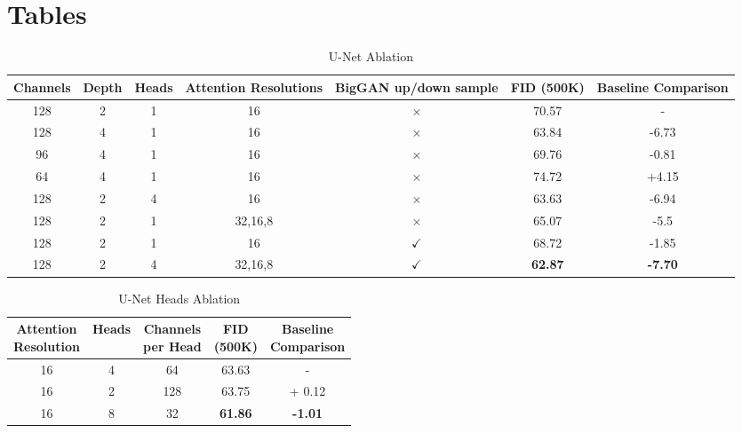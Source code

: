 \documentclass[conference]{IEEEtran}
\begin{document}
\section{Tables}



\begin{table}[H]
    \centering
    \caption{U-Net Ablation}
    \label{tab:unet_table}
    \begin{tabular}{ccccccc}
    \hline
        Channels & Depth & Heads & Attention Resolutions & BigGAN up/down sample & FID (500K) & Baseline Comparison \\ \hline
        \hline
        128 & 2 & 1 & 16 & $\times$ & 70.57 & - \\
        \hline
        128 & 4 & 1 & 16 & $\times$ & 63.84 & -6.73 \\ 
        96 & 4 & 1 & 16 & $\times$ & 69.76 & -0.81 \\ 
        64 & 4 & 1 & 16 & $\times$ & 74.72 & +4.15 \\ 
        128 & 2 & 4 & 16 & $\times$ & 63.63 & -6.94 \\ 
        128 & 2 & 1 & 32,16,8 & $\times$ & 65.07 & -5.5 \\ 
        128 & 2 & 1 & 16 & $\checkmark$ & 68.72 & -1.85 \\ 
        128 & 2 & 4 & 32,16,8 & $\checkmark$ & \textbf{62.87} & \textbf{-7.70} \\ \hline
    \end{tabular}
\end{table}

\begin{table}[H]
    \centering
    \caption{U-Net Heads Ablation}
    \label{tab:unet_heads_table}
    \begin{tabular}{ccccc}
    \hline
        \makecell{Attention\\Resolution} & Heads & \makecell{Channels \\per Head} & \makecell{FID\\ (500K)} & \makecell{Baseline\\Comparison} \\ 
        \hline
        \hline
        16 & 4 & 64 & 63.63 & - \\ 
        \hline
        16 & 2 & 128 & 63.75 & + 0.12 \\ 
        16 & 8 & 32 & \textbf{61.86} & \textbf{-1.01} \\ \hline
    \end{tabular}
\end{table}
\end{document}

